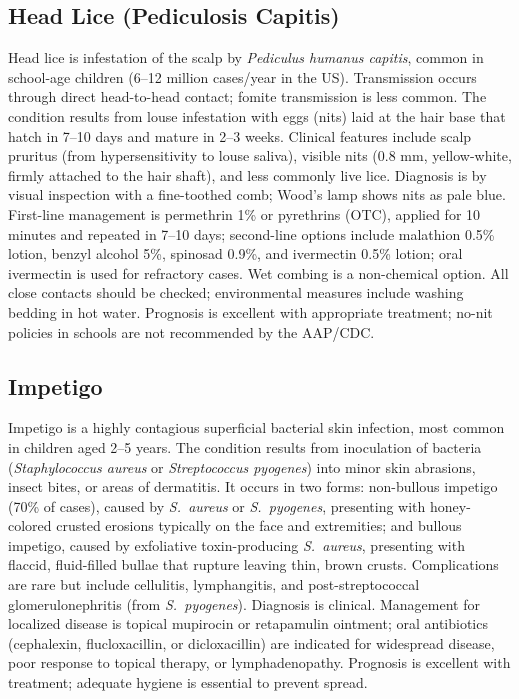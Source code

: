 \label{sec:Cutaneous Infections}

\subsection{Head Lice (Pediculosis Capitis)}
\label{sec:Head Lice}
Head lice is infestation of the scalp by \textit{Pediculus humanus capitis}, common in school-age children (6--12 million cases/year in the US). Transmission occurs through direct head-to-head contact; fomite transmission is less common. The condition results from louse infestation with eggs (nits) laid at the hair base that hatch in 7--10 days and mature in 2--3 weeks. Clinical features include scalp pruritus (from hypersensitivity to louse saliva), visible nits (0.8 mm, yellow-white, firmly attached to the hair shaft), and less commonly live lice. Diagnosis is by visual inspection with a fine-toothed comb; Wood's lamp shows nits as pale blue. First-line management is permethrin 1\% or pyrethrins (OTC), applied for 10 minutes and repeated in 7--10 days; second-line options include malathion 0.5\% lotion, benzyl alcohol 5\%, spinosad 0.9\%, and ivermectin 0.5\% lotion; oral ivermectin is used for refractory cases. Wet combing is a non-chemical option. All close contacts should be checked; environmental measures include washing bedding in hot water. Prognosis is excellent with appropriate treatment; no-nit policies in schools are not recommended by the AAP/CDC.

\subsection{Impetigo}
\label{sec:Impetigo}
Impetigo is a highly contagious superficial bacterial skin infection, most common in children aged 2--5 years. The condition results from inoculation of bacteria (\textit{Staphylococcus aureus} or \textit{Streptococcus pyogenes}) into minor skin abrasions, insect bites, or areas of dermatitis. It occurs in two forms: non-bullous impetigo (70\% of cases), caused by \textit{S.~aureus} or \textit{S.~pyogenes}, presenting with honey-colored crusted erosions typically on the face and extremities; and bullous impetigo, caused by exfoliative toxin-producing \textit{S.~aureus}, presenting with flaccid, fluid-filled bullae that rupture leaving thin, brown crusts. Complications are rare but include cellulitis, lymphangitis, and post-streptococcal glomerulonephritis (from \textit{S.~pyogenes}). Diagnosis is clinical. Management for localized disease is topical mupirocin or retapamulin ointment; oral antibiotics (cephalexin, flucloxacillin, or dicloxacillin) are indicated for widespread disease, poor response to topical therapy, or lymphadenopathy. Prognosis is excellent with treatment; adequate hygiene is essential to prevent spread.

